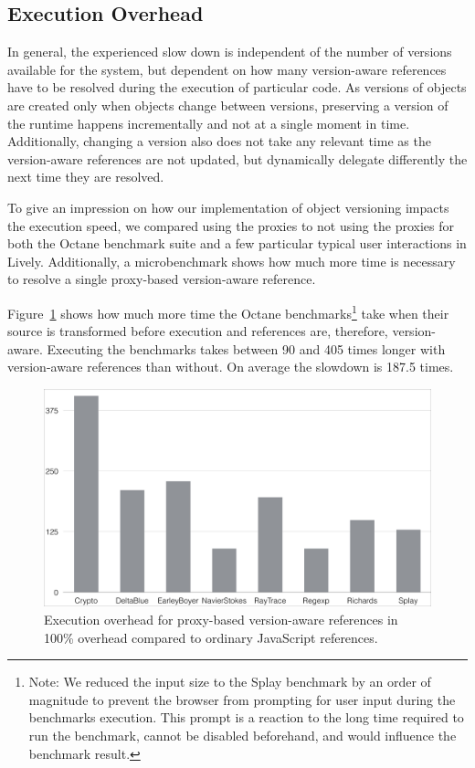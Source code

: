 \subsection{Execution Overhead}

In general, the experienced slow down is independent of the number of versions available for the system, but dependent on how many version-aware references have to be resolved during the execution of particular code.
As versions of objects are created only when objects change between versions, preserving a version of the runtime happens incrementally and not at a single moment in time.
Additionally, changing a version also does not take any relevant time as the version-aware references are not updated, but dynamically delegate differently the next time they are resolved.

To give an impression on how our implementation of object versioning impacts the execution speed, we compared using the proxies to not using the proxies for both the Octane benchmark suite and a few particular typical user interactions in Lively.
Additionally, a microbenchmark shows how much more time is necessary to resolve a single proxy-based version-aware reference.

Figure~\ref{fig:ExecutionOverhead} shows how much more time the Octane benchmarks\footnote{Note: We reduced the input size to the Splay benchmark by an order of magnitude to prevent the browser from prompting for user input during the benchmarks execution. This prompt is a reaction to the long time required to run the benchmark, cannot be disabled beforehand, and would influence the benchmark result.} take when their source is transformed before execution and references are, therefore, version-aware.
Executing the benchmarks takes between 90 and 405 times longer with version-aware references than without.
On average the slowdown is 187.5 times.

\begin{figure}[h]
    \centering
    \includegraphics[width=\textwidth]{figures/executionOverhead.pdf}
    \caption{Execution overhead for proxy-based version-aware references in 100\% overhead compared to ordinary JavaScript references.}
    \label{fig:ExecutionOverhead}
\end{figure}

